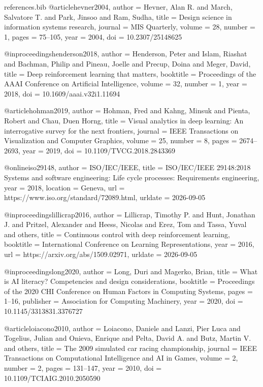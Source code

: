 \begin{filecontents*}{references.bib}
@article{hevner2004,
  author  = {Hevner, Alan R. and March, Salvatore T. and Park, Jinsoo and Ram, Sudha},
  title   = {Design science in information systems research},
  journal = {MIS Quarterly},
  volume  = {28},
  number  = {1},
  pages   = {75--105},
  year    = {2004},
  doi     = {10.2307/25148625}
}

@inproceedings{henderson2018,
  author    = {Henderson, Peter and Islam, Riashat and Bachman, Philip and Pineau, Joelle and Precup, Doina and Meger, David},
  title     = {Deep reinforcement learning that matters},
  booktitle = {Proceedings of the AAAI Conference on Artificial Intelligence},
  volume    = {32},
  number    = {1},
  year      = {2018},
  doi       = {10.1609/aaai.v32i1.11694}
}

@article{hohman2019,
  author  = {Hohman, Fred and Kahng, Minsuk and Pienta, Robert and Chau, Duen Horng},
  title   = {Visual analytics in deep learning: An interrogative survey for the next frontiers},
  journal = {IEEE Transactions on Visualization and Computer Graphics},
  volume  = {25},
  number  = {8},
  pages   = {2674--2693},
  year    = {2019},
  doi     = {10.1109/TVCG.2018.2843369}
}

@online{iso29148,
  author  = {{ISO/IEC/IEEE}},
  title   = {{ISO/IEC/IEEE 29148:2018 Systems and software engineering: Life cycle processes: Requirements engineering}},
  year    = {2018},
  location = {Geneva},
  url     = {https://www.iso.org/standard/72089.html},
  urldate = {2026-09-05}
}

@inproceedings{lillicrap2016,
  author    = {Lillicrap, Timothy P. and Hunt, Jonathan J. and Pritzel, Alexander and Heess, Nicolas and Erez, Tom and Tassa, Yuval and others},
  title     = {Continuous control with deep reinforcement learning},
  booktitle = {International Conference on Learning Representations},
  year      = {2016},
  url       = {https://arxiv.org/abs/1509.02971},
  urldate   = {2026-09-05}
}

@inproceedings{long2020,
  author    = {Long, Duri and Magerko, Brian},
  title     = {What is {AI} literacy? Competencies and design considerations},
  booktitle = {Proceedings of the 2020 CHI Conference on Human Factors in Computing Systems},
  pages     = {1--16},
  publisher = {Association for Computing Machinery},
  year      = {2020},
  doi       = {10.1145/3313831.3376727}
}

@article{loiacono2010,
  author  = {Loiacono, Daniele and Lanzi, Pier Luca and Togelius, Julian and Onieva, Enrique and Pelta, David A. and Butz, Martin V. and others},
  title   = {The 2009 simulated car racing championship},
  journal = {IEEE Transactions on Computational Intelligence and AI in Games},
  volume  = {2},
  number  = {2},
  pages   = {131--147},
  year    = {2010},
  doi     = {10.1109/TCIAIG.2010.2050590}
}


\end{filecontents*}
